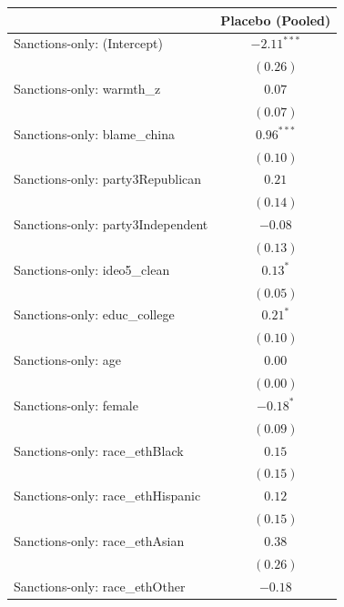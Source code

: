 
\begin{tabular}{l c}
\hline
 & Placebo (Pooled) \\
\hline
Sanctions-only: (Intercept)                & $-2.11^{***}$ \\
                                           & $(0.26)$      \\
Sanctions-only: warmth\_z                  & $0.07$        \\
                                           & $(0.07)$      \\
Sanctions-only: blame\_china               & $0.96^{***}$  \\
                                           & $(0.10)$      \\
Sanctions-only: party3Republican           & $0.21$        \\
                                           & $(0.14)$      \\
Sanctions-only: party3Independent          & $-0.08$       \\
                                           & $(0.13)$      \\
Sanctions-only: ideo5\_clean               & $0.13^{*}$    \\
                                           & $(0.05)$      \\
Sanctions-only: educ\_college              & $0.21^{*}$    \\
                                           & $(0.10)$      \\
Sanctions-only: age                        & $0.00$        \\
                                           & $(0.00)$      \\
Sanctions-only: female                     & $-0.18^{*}$   \\
                                           & $(0.09)$      \\
Sanctions-only: race\_ethBlack             & $0.15$        \\
                                           & $(0.15)$      \\
Sanctions-only: race\_ethHispanic          & $0.12$        \\
                                           & $(0.15)$      \\
Sanctions-only: race\_ethAsian             & $0.38$        \\
                                           & $(0.26)$      \\
Sanctions-only: race\_ethOther             & $-0.18$       \\

\end{tabular}
